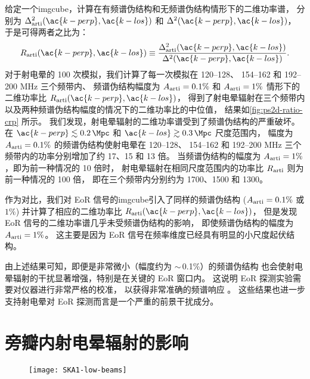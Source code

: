 给定一个\ac{imgcube}，计算在有频谱伪结构和无频谱伪结构情形下的二维功率谱，
分别为 $\Delta^2_{\R{arti}}(\ac{k-perp}, \ac{k-los})$
和 $\Delta^2(\ac{k-perp}, \ac{k-los})$，
于是可得两者之比为：
\begin{equation}
  R_{\R{arti}}(\ac{k-perp}, \ac{k-los})
    \equiv \frac{\Delta^2_{\R{arti}}(\ac{k-perp}, \ac{k-los})}{
      \Delta^2(\ac{k-perp}, \ac{k-los})} .
\end{equation}
对于射电晕的 100 次模拟，我们计算了每一次模拟在 \numrange{120}{128}、
\numrange{154}{162} 和 \numrange{192}{200} \si{\MHz} 三个频带内、
频谱伪结构幅度为 $A_{\mathrm{arti}} = 0.1\%$ 和 $A_{\mathrm{arti}} = 1\%$
情形下的二维功率比 $R_{\R{arti}}(\ac{k-perp}, \ac{k-los})$，
得到了射电晕辐射在三个频带内以及两种频谱伪结构幅度的情况下的二维功率比的中位值，
结果如\autoref{fig:ps2d-ratio-crp} 所示。
我们发现，射电晕辐射的二维功率谱受到了频谱伪结构的严重破坏。
在 $\ac{k-perp} \lesssim \SI{0.2}{\per\Mpc}$ 和
$\ac{k-los} \gtrsim \SI{0.3}{\per\Mpc}$ 尺度范围内，
幅度为 $A_{\mathrm{arti}} = 0.1\%$ 的频谱伪结构使射电晕在 \numrange{120}{128}、
\numrange{154}{162} 和 \numrange{192}{200} \si{\MHz}
三个频带内的功率分别增加了约 17、15 和 13 倍。
当频谱伪结构的幅度为 $A_{\mathrm{arti}} = 1\%$，即为前一种情况的 10 倍时，
射电晕辐射在相同尺度范围内的功率比 $R_{\mathrm{arti}}$ 则为前一种情况的 100 倍，
即在三个频带内分别约为 1700、1500 和 1300。

作为对比，我们对 EoR 信号的\ac{imgcube}引入了同样的频谱伪结构
($A_{\mathrm{arti}} = 0.1\%$ 或 $1\%$)
并计算了相应的二维功率比 $R_{\R{arti}}(\ac{k-perp}, \ac{k-los})$，
但是发现 EoR 信号的二维功率谱几乎未受频谱伪结构的影响，
即使频谱伪结构的幅度为 $A_{\mathrm{arti}} = 1\%$。
这主要是因为 EoR 信号在频率维度已经具有明显的小尺度起伏结构。

由上述结果可知，即便是非常微小（幅度约为 $\sim$\,0.1\%）的频谱伪结构
也会使射电晕辐射的干扰显著增强，特别是在关键的 EoR 窗口内。
这说明 EoR 探测实验需要对仪器进行非常严格的校准，
以获得非常准确的频谱响应 \cite{barry2016}。
这些结果也进一步支持射电晕对 EoR 探测而言是一个严重的前景干扰成分。


\section{旁瓣内射电晕辐射的影响}
\label{sec:fscn}

\begin{figure}[htp]
  \centering
  \texttt{[image: SKA1-low-beams]}
  \label{fig:ska-beams}
\end{figure}

